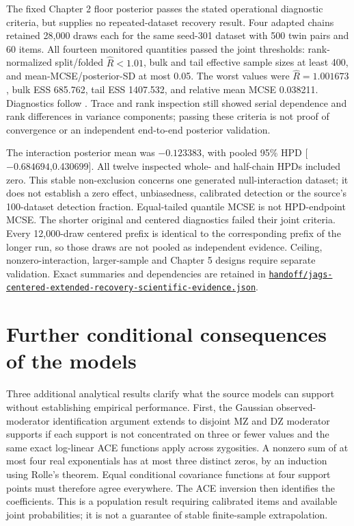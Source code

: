 \documentclass[11pt]{article}
\begin{document}
The fixed Chapter 2 floor posterior passes the stated operational diagnostic criteria, but supplies no repeated-dataset recovery result. Four adapted chains retained 28,000 draws each for the same seed-301 dataset with 500 twin pairs and 60 items. All fourteen monitored quantities passed the joint thresholds: rank-normalized split/folded $\widehat R<1.01$, bulk and tail effective sample sizes at least 400, and mean-MCSE/posterior-SD at most 0.05. The worst values were $\widehat R=1.001673$, bulk ESS 685.762, tail ESS 1407.532, and relative mean MCSE 0.038211. Diagnostics follow \citet{vehtari2021}. Trace and rank inspection still showed serial dependence and rank differences in variance components; passing these criteria is not proof of convergence or an independent end-to-end posterior validation.

The interaction posterior mean was $-0.123383$, with pooled 95\% HPD [$-0.684694$,0.430699]. All twelve inspected whole- and half-chain HPDs included zero. This stable non-exclusion concerns one generated null-interaction dataset; it does not establish a zero effect, unbiasedness, calibrated detection or the source's 100-dataset detection fraction. Equal-tailed quantile MCSE is not HPD-endpoint MCSE. The shorter original and centered diagnostics failed their joint criteria. Every 12,000-draw centered prefix is identical to the corresponding prefix of the longer run, so those draws are not pooled as independent evidence. Ceiling, nonzero-interaction, larger-sample and Chapter 5 designs require separate validation. Exact summaries and dependencies are retained in \href{https://github.com/alectionary/vibe-math/blob/master/formalization/schwabe-psychometric-genetics/handoff/jags-centered-extended-recovery-scientific-evidence.json}{\nolinkurl{handoff/jags-centered-extended-recovery-scientific-evidence.json}}.


\section{Further conditional consequences of the models}
Three additional analytical results clarify what the source models can support without establishing empirical performance. First, the Gaussian observed-moderator identification argument extends to disjoint MZ and DZ moderator supports if each support is not concentrated on three or fewer values and the same exact log-linear ACE functions apply across zygosities. A nonzero sum of at most four real exponentials has at most three distinct zeros, by an induction using Rolle's theorem. Equal conditional covariance functions at four support points must therefore agree everywhere. The ACE inversion then identifies the coefficients. This is a population result requiring calibrated items and available joint probabilities; it is not a guarantee of stable finite-sample extrapolation.
\end{document}
